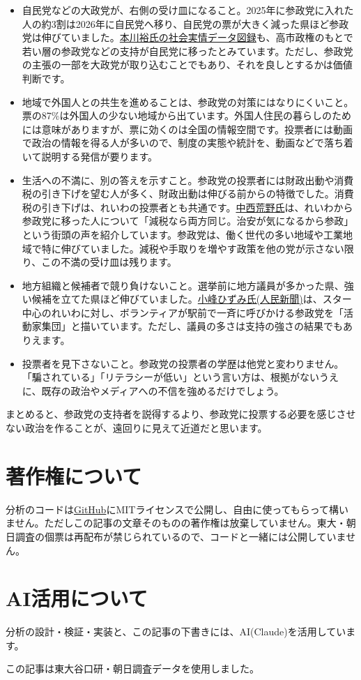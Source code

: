 \documentclass[a4paper,11pt]{ltjsarticle}
\begin{document}
\begin{itemize}[nosep]
\item 自民党などの大政党が、右側の受け皿になること。2025年に参政党に入れた人の約3割は2026年に自民党へ移り、自民党の票が大きく減った県ほど参政党は伸びていました。\href{https://honkawa2.sakura.ne.jp/5235h.html}{本川裕氏の社会実情データ図録}も、高市政権のもとで若い層の参政党などの支持が自民党に移ったとみています。ただし、参政党の主張の一部を大政党が取り込むことでもあり、それを良しとするかは価値判断です。
\item 地域で外国人との共生を進めることは、参政党の対策にはなりにくいこと。票の87\%は外国人の少ない地域から出ています。外国人住民の暮らしのためには意味がありますが、票に効くのは全国の情報空間です。投票者には動画で政治の情報を得る人が多いので、制度の実態や統計を、動画などで落ち着いて説明する発信が要ります。
\item 生活への不満に、別の答えを示すこと。参政党の投票者には財政出動や消費税の引き下げを望む人が多く、財政出動は伸びる前からの特徴でした。消費税の引き下げは、れいわの投票者とも共通です。\href{https://note.com/agile_allium977/n/n9694f6822765}{中西荒野氏}は、れいわから参政党に移った人について「減税なら両方同じ。治安が気になるから参政」という街頭の声を紹介しています。参政党は、働く世代の多い地域や工業地域で特に伸びていました。減税や手取りを増やす政策を他の党が示さない限り、この不満の受け皿は残ります。
\item 地方組織と候補者で競り負けないこと。選挙前に地方議員が多かった県、強い候補を立てた県ほど伸びていました。\href{https://note.com/jinminshinbun/n/n4c4cf60e9cff}{小峰ひずみ氏(人民新聞)}は、スター中心のれいわに対し、ボランティアが駅前で一斉に呼びかける参政党を「活動家集団」と描いています。ただし、議員の多さは支持の強さの結果でもありえます。
\item 投票者を見下さないこと。参政党の投票者の学歴は他党と変わりません。「騙されている」「リテラシーが低い」という言い方は、根拠がないうえに、既存の政治やメディアへの不信を強めるだけでしょう。
\end{itemize}

まとめると、参政党の支持者を説得するより、参政党に投票する必要を感じさせない政治を作ることが、遠回りに見えて近道だと思います。

\section*{著作権について}

分析のコードは\href{https://github.com/hrkimura/seiryoku-shisu/tree/master/sanseito_geo}{GitHub}にMITライセンスで公開し、自由に使ってもらって構いません。ただしこの記事の文章そのものの著作権は放棄していません。東大・朝日調査の個票は再配布が禁じられているので、コードと一緒には公開していません。

\section*{AI活用について}

分析の設計・検証・実装と、この記事の下書きには、AI(Claude)を活用しています。

{\small この記事は東大谷口研・朝日調査データを使用しました。}
\end{document}
